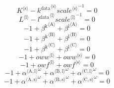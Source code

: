 \begin{equation}
{K}^{\langle \mathrm{s}\rangle} - {{k^{\mathrm{data}}}^{\langle \mathrm{\mathrm{s}}\rangle}} {{{s\!c\!a\!l\!e}}^{\langle \mathrm{\mathrm{s}}\rangle}}^{-1} = 0
\end{equation}
\begin{equation}
{L}^{\langle \mathrm{l}\rangle} - {{l^{\mathrm{data}}}^{\langle \mathrm{\mathrm{l}}\rangle}} {{{s\!c\!a\!l\!e}}^{\langle \mathrm{\mathrm{l}}\rangle}}^{-1} = 0
\end{equation}
\begin{equation}
-1 + {\beta^{\mathrm{k}}}^{\langle \mathrm{\mathrm{A}}\rangle} + {\beta^{\mathrm{l}}}^{\langle \mathrm{\mathrm{A}}\rangle} = 0
\end{equation}
\begin{equation}
-1 + {\beta^{\mathrm{k}}}^{\langle \mathrm{\mathrm{B}}\rangle} + {\beta^{\mathrm{l}}}^{\langle \mathrm{\mathrm{B}}\rangle} = 0
\end{equation}
\begin{equation}
-1 + {\beta^{\mathrm{k}}}^{\langle \mathrm{\mathrm{C}}\rangle} + {\beta^{\mathrm{l}}}^{\langle \mathrm{\mathrm{C}}\rangle} = 0
\end{equation}
\begin{equation}
-1 + {{o\!w\!w}}^{\langle \mathrm{\mathrm{l}}\rangle} + {{o\!w\!w}}^{\langle \mathrm{\mathrm{s}}\rangle} = 0
\end{equation}
\begin{equation}
-1 + {{o\!w\!f}}^{\langle \mathrm{\mathrm{l}}\rangle} + {{o\!w\!f}}^{\langle \mathrm{\mathrm{s}}\rangle} = 0
\end{equation}
\begin{equation}
-1 + {{\alpha}^{\langle \mathrm{\mathrm{A}},\mathrm{\mathrm{l}}\rangle}}^{\omega} + {{\alpha}^{\langle \mathrm{\mathrm{B}},\mathrm{\mathrm{l}}\rangle}}^{\omega} + {{\alpha}^{\langle \mathrm{\mathrm{C}},\mathrm{\mathrm{l}}\rangle}}^{\omega} = 0
\end{equation}
\begin{equation}
-1 + {{\alpha}^{\langle \mathrm{\mathrm{A}},\mathrm{\mathrm{s}}\rangle}}^{\omega} + {{\alpha}^{\langle \mathrm{\mathrm{B}},\mathrm{\mathrm{s}}\rangle}}^{\omega} + {{\alpha}^{\langle \mathrm{\mathrm{C}},\mathrm{\mathrm{s}}\rangle}}^{\omega} = 0
\end{equation}






